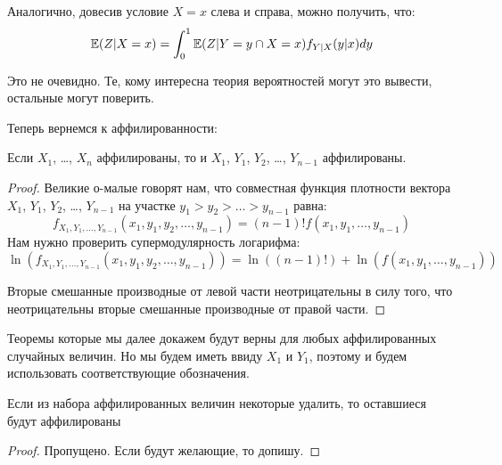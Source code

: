 Аналогично, довесив условие $ X=x $ слева и справа, можно получить, что:
\begin{equation}
\label{iterated_e}
\mathbb{E}(Z|X=x)=\int_{0}^{1}\mathbb{E}(Z|Y=y\cap X=x)f_{Y|X}(y|x)dy
\end{equation}

Это не очевидно. Те, кому интересна теория вероятностей могут это вывести, остальные могут поверить.



Теперь вернемся к аффилированности:

\begin{myth}
\label{aff_order}
Если $ X_{1} $, \ldots, $ X_{n} $ аффилированы, то и $ X_{1} $, $ Y_{1} $, $ Y_{2} $, \ldots, $ Y_{n-1} $ аффилированы.
\end{myth}

\begin{proof}
Великие о-малые говорят нам, что совместная функция плотности вектора $ X_{1} $, $ Y_{1} $, $ Y_{2} $, \ldots, $ Y_{n-1} $ на участке $ y_{1}>y_{2}>\ldots>y_{n-1} $ равна:
\begin{equation}
f_{X_{1},Y_{1},\ldots,Y_{n-1}}(x_{1},y_{1},y_{2},\ldots,y_{n-1})=(n-1)!f(x_{1},y_{1},\ldots,y_{n-1})
\end{equation}
Нам нужно проверить супермодулярность логарифма:
\begin{equation}
\ln(f_{X_{1},Y_{1},\ldots,Y_{n-1}}(x_{1},y_{1},y_{2},\ldots,y_{n-1}))=\ln((n-1)!)+\ln(f(x_{1},y_{1},\ldots,y_{n-1}))
\end{equation}

Вторые смешанные производные от левой части неотрицательны в силу того, что неотрицательны вторые смешанные производные от правой части.

\end{proof}



Теоремы которые мы далее докажем будут верны для любых аффилированных случайных величин. Но мы будем иметь ввиду $ X_{1} $ и $ Y_{1} $, поэтому и будем использовать соответствующие обозначения.

\begin{myth}
\label{aff_delete}
Если из набора аффилированных величин некоторые удалить, то оставшиеся будут аффилированы
\end{myth}

\begin{proof} 
Пропущено. Если будут желающие, то допишу.

\end{proof}


